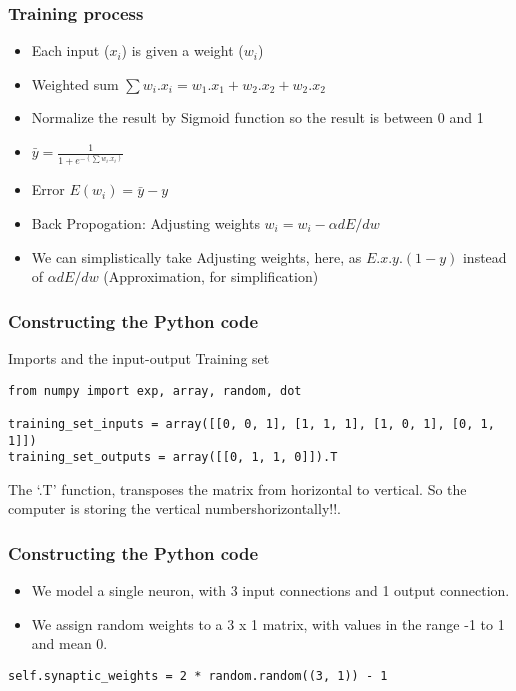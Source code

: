 \begin{frame}[fragile] \frametitle{Training process}

\begin{itemize}
\item Each input ($x_i$) is given a weight ($w_i$)
\item Weighted sum $\sum w_i . x_i = w_1 . x_1 + w_2 . x_2 + w_2 . x_2$
\item Normalize the result by Sigmoid function so the result is between 0 and 1 
\item $\bar{y} = \frac{1}{1 + e^{-(\sum w_i . x_i )}}$
\item Error $E(w_i) = \bar{y} - y$ 
\item Back Propogation: Adjusting weights $w_i = w_i - \alpha dE/dw$
\item We can simplistically take Adjusting weights, here, as $E.x.y.(1 - y)$ instead of $\alpha dE/dw$ (Approximation, for simplification)
\end{itemize}
\end{frame}

\begin{frame}[fragile] \frametitle{Constructing the Python code}
Imports and the input-output Training set
\begin{lstlisting}
from numpy import exp, array, random, dot

training_set_inputs = array([[0, 0, 1], [1, 1, 1], [1, 0, 1], [0, 1, 1]])
training_set_outputs = array([[0, 1, 1, 0]]).T
\end{lstlisting}
The `.T' function, transposes the matrix from horizontal to vertical. So the computer is storing the vertical numbershorizontally!!.
\end{frame}

\begin{frame}[fragile] \frametitle{Constructing the Python code}
\begin{itemize}
\item We model a single neuron, with 3 input connections and 1 output connection.
\item We assign random weights to a 3 x 1 matrix, with values in the range -1 to 1 and mean 0.
\end{itemize}
\begin{lstlisting}
self.synaptic_weights = 2 * random.random((3, 1)) - 1
\end{lstlisting}
\end{frame}

